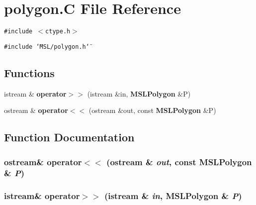 \section{polygon.C File Reference}
\label{polygon_8C}
{\tt \#include $<$ctype.h$>$}\par
{\tt \#include \char`\"{}MSL/polygon.h\char`\"{}}\par
\subsection*{Functions}
\begin{CompactItemize}
\item 
istream \& {\bf operator$>$$>$} (istream \&in, {\bf MSLPolygon} \&P)
\item 
ostream \& {\bf operator$<$$<$} (ostream \&out, const {\bf MSLPolygon} \&P)
\end{CompactItemize}


\subsection{Function Documentation}
\subsubsection{\setlength{\rightskip}{0pt plus 5cm}ostream\& operator$<$$<$ (ostream \& {\em out}, const {\bf MSLPolygon} \& {\em P})}\label{polygon_8C_a1}


\subsubsection{\setlength{\rightskip}{0pt plus 5cm}istream\& operator$>$$>$ (istream \& {\em in}, {\bf MSLPolygon} \& {\em P})}\label{polygon_8C_a0}


